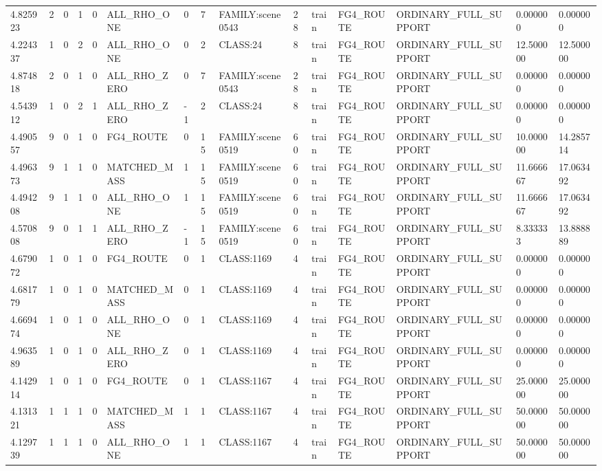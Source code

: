 \begin{tabular}{lllllllllllllll}
4.825923 & 2 & 0 & 1 & 0 & ALL\_RHO\_ONE & 0 & 7 & FAMILY:scene0543 & 28 & train & FG4\_ROUTE & ORDINARY\_FULL\_SUPPORT & 0.000000 & 0.000000 \\
4.224337 & 1 & 0 & 2 & 0 & ALL\_RHO\_ONE & 0 & 2 & CLASS:24 & 8 & train & FG4\_ROUTE & ORDINARY\_FULL\_SUPPORT & 12.500000 & 12.500000 \\
4.874818 & 2 & 0 & 1 & 0 & ALL\_RHO\_ZERO & 0 & 7 & FAMILY:scene0543 & 28 & train & FG4\_ROUTE & ORDINARY\_FULL\_SUPPORT & 0.000000 & 0.000000 \\
4.543912 & 1 & 0 & 2 & 1 & ALL\_RHO\_ZERO & -1 & 2 & CLASS:24 & 8 & train & FG4\_ROUTE & ORDINARY\_FULL\_SUPPORT & 0.000000 & 0.000000 \\
4.490557 & 9 & 0 & 1 & 0 & FG4\_ROUTE & 0 & 15 & FAMILY:scene0519 & 60 & train & FG4\_ROUTE & ORDINARY\_FULL\_SUPPORT & 10.000000 & 14.285714 \\
4.496373 & 9 & 1 & 1 & 0 & MATCHED\_MASS & 1 & 15 & FAMILY:scene0519 & 60 & train & FG4\_ROUTE & ORDINARY\_FULL\_SUPPORT & 11.666667 & 17.063492 \\
4.494208 & 9 & 1 & 1 & 0 & ALL\_RHO\_ONE & 1 & 15 & FAMILY:scene0519 & 60 & train & FG4\_ROUTE & ORDINARY\_FULL\_SUPPORT & 11.666667 & 17.063492 \\
4.570808 & 9 & 0 & 1 & 1 & ALL\_RHO\_ZERO & -1 & 15 & FAMILY:scene0519 & 60 & train & FG4\_ROUTE & ORDINARY\_FULL\_SUPPORT & 8.333333 & 13.888889 \\
4.679072 & 1 & 0 & 1 & 0 & FG4\_ROUTE & 0 & 1 & CLASS:1169 & 4 & train & FG4\_ROUTE & ORDINARY\_FULL\_SUPPORT & 0.000000 & 0.000000 \\
4.681779 & 1 & 0 & 1 & 0 & MATCHED\_MASS & 0 & 1 & CLASS:1169 & 4 & train & FG4\_ROUTE & ORDINARY\_FULL\_SUPPORT & 0.000000 & 0.000000 \\
4.669474 & 1 & 0 & 1 & 0 & ALL\_RHO\_ONE & 0 & 1 & CLASS:1169 & 4 & train & FG4\_ROUTE & ORDINARY\_FULL\_SUPPORT & 0.000000 & 0.000000 \\
4.963589 & 1 & 0 & 1 & 0 & ALL\_RHO\_ZERO & 0 & 1 & CLASS:1169 & 4 & train & FG4\_ROUTE & ORDINARY\_FULL\_SUPPORT & 0.000000 & 0.000000 \\
4.142914 & 1 & 0 & 1 & 0 & FG4\_ROUTE & 0 & 1 & CLASS:1167 & 4 & train & FG4\_ROUTE & ORDINARY\_FULL\_SUPPORT & 25.000000 & 25.000000 \\
4.131321 & 1 & 1 & 1 & 0 & MATCHED\_MASS & 1 & 1 & CLASS:1167 & 4 & train & FG4\_ROUTE & ORDINARY\_FULL\_SUPPORT & 50.000000 & 50.000000 \\
4.129739 & 1 & 1 & 1 & 0 & ALL\_RHO\_ONE & 1 & 1 & CLASS:1167 & 4 & train & FG4\_ROUTE & ORDINARY\_FULL\_SUPPORT & 50.000000 & 50.000000 \\

\end{tabular}
